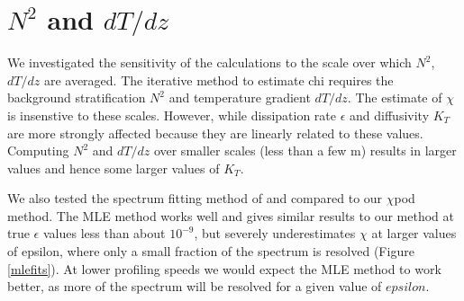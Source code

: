 \documentclass{ametsoc}
\providecommand{\DIFadd}[1]{{\protect\color{blue}\uwave{#1}}} %
\providecommand{\DIFdel}[1]{{\protect\color{red}\sout{#1}}}                      %
\providecommand{\DIFaddbegin}{} %
\providecommand{\DIFaddend}{} %
\providecommand{\DIFdelbegin}{} %
\providecommand{\DIFdelend}{} %
\begin{document}

\section{$N^2$ and $dT/dz$}

We investigated the sensitivity of the calculations to the scale over which $N^2$, $dT/dz$ are averaged. The iterative method to estimate chi requires the background stratification $N^2$ and temperature gradient $dT/dz$. The estimate of $\chi$ is insenstive to these scales. However, while dissipation rate $\epsilon$ and diffusivity $K_T$ are more strongly affected because they are linearly related to these values. Computing $N^2$ and $dT/dz$ over smaller scales (less than a few m) results in larger values and hence some larger values of $K_T$.

%
%
%

\appendix[B]


We also tested the spectrum fitting method of \cite{ruddicketal00} and compared to our $\chi$pod method. The MLE method works well and gives similar results to our method at true $\epsilon$ values less than about $10^{-9}$, but severely underestimates $\chi$ at larger values of epsilon, where only a small fraction of the spectrum is resolved (Figure \ref{mlefits}). At lower profiling speeds we would expect the MLE method to work better, as more of the spectrum will be resolved for a given value of \DIFdelbegin \DIFdel{$epsilon$}\DIFdelend \DIFaddbegin \DIFadd{$\epsilon$}\DIFaddend .


\DIFdelbegin %
\DIFdelend \DIFaddbegin \appendix[C]
\DIFaddend 


\end{document}
